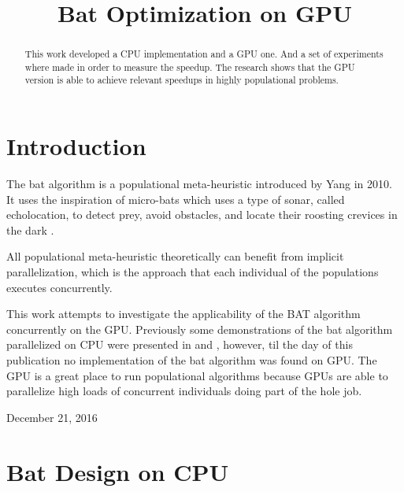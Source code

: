 \documentclass[conference]{IEEEtran}
\begin{document}
\title{Bat Optimization on GPU}

\author{
}

\maketitle
\begin{abstract}
This work developed a CPU implementation and a GPU one. And a set of
experiments where made in order to measure the speedup. The research
shows that the GPU version is able to achieve relevant speedups in
highly populational problems.
\end{abstract}
\IEEEpeerreviewmaketitle

\section{Introduction}

The bat algorithm is a populational meta-heuristic introduced by Yang in
2010. It uses the inspiration of micro-bats which uses a type of sonar,
called echolocation, to detect prey, avoid obstacles, and locate their
roosting crevices in the dark \cite{original}.

All populational meta-heuristic theoretically can benefit from implicit
parallelization, which is the approach that each individual of the
populations executes concurrently.

This work attempts to investigate the applicability of the BAT algorithm
concurrently on the GPU. Previously some demonstrations of the bat
algorithm parallelized on CPU were presented in \cite{paralellCPUFirst}
and \cite{paralellCPU}, however, til the day of this publication no
implementation of the bat algorithm was found on GPU. The GPU is a
great place to run populational algorithms because GPUs are able to
parallelize high loads of concurrent individuals doing part of the hole
job.

\hfill December 21, 2016

\section{Bat Design on CPU}
\end{document}
